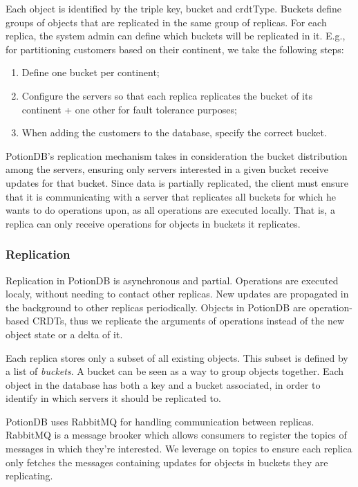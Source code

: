 \documentclass{vldb}
\begin{document}
Each object is identified by the triple key, bucket and crdtType.
Buckets define groups of objects that are replicated in the same group of replicas.
For each replica, the system admin can define which buckets will be replicated in it.
E.g., for partitioning customers based on their continent, we take the following steps:

\begin{enumerate}
	\item Define one bucket per continent;
	\item Configure the servers so that each replica replicates the bucket of its continent + one other for fault tolerance purposes;
	\item When adding the customers to the database, specify the correct bucket.
\end{enumerate}

PotionDB's replication mechanism takes in consideration the bucket distribution among the servers, ensuring only servers interested in a given bucket receive updates for that bucket.
Since data is partially replicated, the client must ensure that it is communicating with a server that replicates all buckets for which he wants to do operations upon, as all operations are executed locally.
That is, a replica can only receive operations for objects in buckets it replicates.

\subsubsection{Replication}

Replication in PotionDB is asynchronous and partial.
Operations are executed localy, without needing to contact other replicas.
New updates are propagated in the background to other replicas periodically.
Objects in PotionDB are operation-based CRDTs, thus we replicate the arguments of operations instead of the new object state or a delta of it.

Each replica stores only a subset of all existing objects.
This subset is defined by a list of \emph{buckets}.
A bucket can be seen as a way to group objects together.
Each object in the database has both a key and a bucket associated, in order to identify in which servers it should be replicated to.

PotionDB uses RabbitMQ \cite{???} for handling communication between replicas.
RabbitMQ is a message brooker which allows consumers to register the topics of messages in which they're interested.
We leverage on topics to ensure each replica only fetches the messages containing updates for objects in buckets they are replicating.
\end{document}
